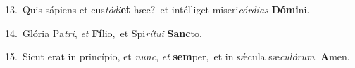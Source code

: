 {\numbfont\textcolor{\numbcolor}{13.}}~Quis sápiens et cus\-\textit{tó}\-\textit{di}\textbf{et} hæc?~\star et intélliget miseri\-\textit{cór}\-\textit{di}\textit{as} \textbf{Dó}\-\textbf{mi}ni.\par
{\numbfont\textcolor{\numbcolor}{14.}}~Glória Pa\-\textit{tri}\-, \textit{et} \textbf{Fí}\-lio,~\star et Spi\-\textit{rí}\-\textit{tu}\textit{i} \textbf{Sanc}\-to.\par
{\numbfont\textcolor{\numbcolor}{15.}}~Sicut erat in princípio, et \textit{nunc}\-, \textit{et} \textbf{sem}\-per,~\star et in sǽcula sæ\-\textit{cu}\-\textit{ló}\textit{rum}. \textbf{A}\-men.\par
